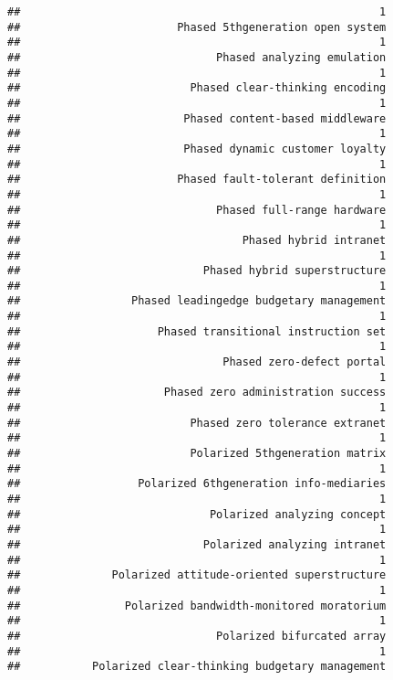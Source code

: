 \documentclass[
]{article}
\begin{document}
\begin{verbatim}
##                                                       1 
##                        Phased 5thgeneration open system 
##                                                       1 
##                              Phased analyzing emulation 
##                                                       1 
##                          Phased clear-thinking encoding 
##                                                       1 
##                         Phased content-based middleware 
##                                                       1 
##                         Phased dynamic customer loyalty 
##                                                       1 
##                        Phased fault-tolerant definition 
##                                                       1 
##                              Phased full-range hardware 
##                                                       1 
##                                  Phased hybrid intranet 
##                                                       1 
##                            Phased hybrid superstructure 
##                                                       1 
##                 Phased leadingedge budgetary management 
##                                                       1 
##                     Phased transitional instruction set 
##                                                       1 
##                               Phased zero-defect portal 
##                                                       1 
##                      Phased zero administration success 
##                                                       1 
##                          Phased zero tolerance extranet 
##                                                       1 
##                          Polarized 5thgeneration matrix 
##                                                       1 
##                  Polarized 6thgeneration info-mediaries 
##                                                       1 
##                             Polarized analyzing concept 
##                                                       1 
##                            Polarized analyzing intranet 
##                                                       1 
##              Polarized attitude-oriented superstructure 
##                                                       1 
##                Polarized bandwidth-monitored moratorium 
##                                                       1 
##                              Polarized bifurcated array 
##                                                       1 
##           Polarized clear-thinking budgetary management 

\end{verbatim}
\end{document}
